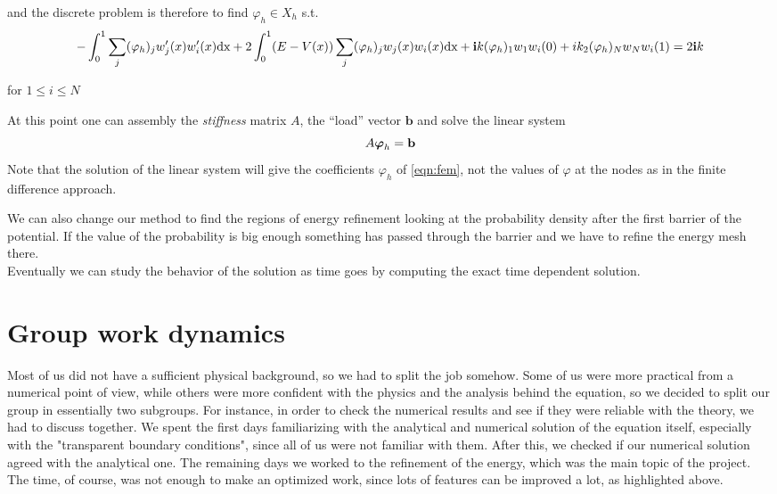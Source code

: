 \documentclass[12pt,a4paper,onecolumn]{article}
\theoremstyle{definition}
\theoremstyle{plain}
\newcommand{\var}{\varphi}
\begin{document}
and the discrete problem is therefore to find $\var_h \in X_h$ s.t.
\[
-\int_0^1  \sum_j (\var_h)_j w_j'(x) w_i'(x) \text{dx} + 2 \int_0^1 (E-V(x)) \sum_j (\var_h)_j w_j(x) w_i(x) \text{dx} + \bold{i}k (\var_h)_1 w_{1}w_{i}(0) + i k_2 (\var_h)_N w_N w_i(1)= 2 \bold{i} k
\]

for $1\leq i \leq N$ 




At this point one can assembly the \emph{stiffness} matrix $A$, the ``load'' vector $\boldsymbol{b}$ and solve the linear system \[
A \boldsymbol{\var}_h= \bold{b}\]
Note that the solution of the linear system will give the coefficients $\var_h$ of  \eqref{eqn:fem}, not the values of $\var$ at the nodes as in the finite difference approach.





We can also change our method to find the regions of energy refinement looking at the probability density after the first barrier of the potential. If the value of the probability is big enough something has passed through the barrier and we have to refine the energy mesh there.\\
Eventually we can study the behavior of the solution as time goes by computing the exact time dependent solution.   


\section{Group work dynamics}

Most of us did not have a sufficient physical background, so we had to split the job somehow. Some of us were more practical from a numerical point of view, while others were more confident with the physics and the analysis behind the equation, so we decided to split our group in essentially two subgroups. For instance, in order to check the numerical results and see if they were reliable with the theory, we had to discuss together. We spent the first days familiarizing with the analytical and numerical solution of the equation itself, especially with the "transparent boundary conditions", since all of us were not familiar with them. After this, we checked if our numerical solution agreed with the analytical one. The remaining days we worked to the refinement of the energy, which was the main topic of the project. The time, of course, was not enough to make an optimized work, since lots of features can be improved a lot, as highlighted above.
\end{document}
